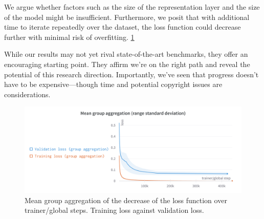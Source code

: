 We argue whether factors such as the size of the representation layer and the size of the model \cite{verydeep} might be insufficient. Furthermore, we posit that with additional time to iterate repeatedly over the dataset, the loss function could decrease further with minimal risk of overfitting. \ref{fig:lossf}

While our results may not yet rival state-of-the-art benchmarks, they offer an encouraging starting point. They affirm we're on the right path and reveal the potential of this research direction. Importantly, we've seen that progress doesn't have to be expensive—though time and potential copyright issues are considerations.

\begin{figure}[h]
    \centering
    \includegraphics[width=\textwidth]{figures/images/Mean group aggregation.png}
    \caption[Loss function performance plot]{Mean group aggregation of the decrease of the loss function over trainer/global steps. Training loss against validation loss.}
    \label{fig:lossf}
\end{figure}



\newpage


